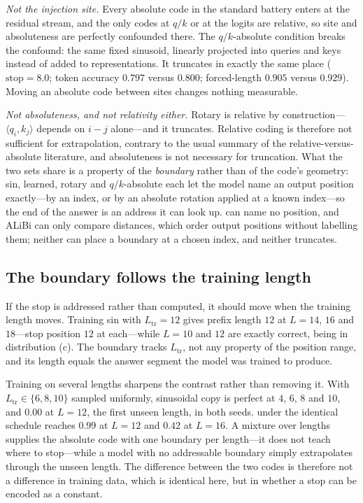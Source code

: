 \emph{Not the injection site.} Every absolute code in the standard battery enters
at the residual stream, and the only codes at $q/k$ or at the logits are relative,
so site and absoluteness are perfectly confounded there. The $q/k$-absolute
condition breaks the confound: the same fixed sinusoid, linearly projected into
queries and keys instead of added to representations. It truncates in exactly the
same place ($\mathrm{stop}{=}8.0$; token accuracy $0.797$ versus $0.800$;
forced-length $0.905$ versus $0.929$). Moving an absolute code between sites changes
nothing measurable.

\emph{Not absoluteness, and not relativity either.} Rotary is relative by
construction---$\langle q_i,k_j\rangle$ depends on $i-j$ alone---and it truncates.
Relative coding is therefore not sufficient for extrapolation, contrary to the usual
summary of the relative-versus-absolute literature, and absoluteness is not
necessary for truncation. What the two sets share is a property of the
\emph{boundary} rather than of the code's geometry: sin, learned, rotary and
$q/k$-absolute each let the model name an output position exactly---by an index, or
by an absolute rotation applied at a known index---so the end of the answer is an
address it can look up. \nope{} can name no position, and ALiBi can only compare
distances, which order output positions without labelling them; neither can place a
boundary at a chosen index, and neither truncates.

\subsection{The boundary follows the training length}
\label{sec:moves}

If the stop is addressed rather than computed, it should move when the training
length moves. Training sin with $L_{\mathrm{tr}}{=}12$ gives prefix length $12$ at
$L{=}14$, $16$ and $18$---stop position $12$ at each---while $L{=}10$ and $12$ are
exactly correct, being in distribution (c). The boundary tracks
$L_{\mathrm{tr}}$, not any property of the position range, and its length equals the
answer segment the model was trained to produce.

Training on several lengths sharpens the contrast rather than removing it. With
$L_{\mathrm{tr}}\in\{6,8,10\}$ sampled uniformly, sinusoidal copy is perfect at
$4$, $6$, $8$ and $10$, and $0.00$ at $L{=}12$, the first unseen length, in both
seeds. \nope{} under the identical schedule reaches $0.99$ at $L{=}12$ and $0.42$
at $L{=}16$. A mixture over lengths supplies the absolute code with one boundary per
length---it does not teach where to stop---while a model with no addressable
boundary simply extrapolates through the unseen length. The difference between the
two codes is therefore not a difference in training data, which is identical here,
but in whether a stop can be encoded as a constant.

